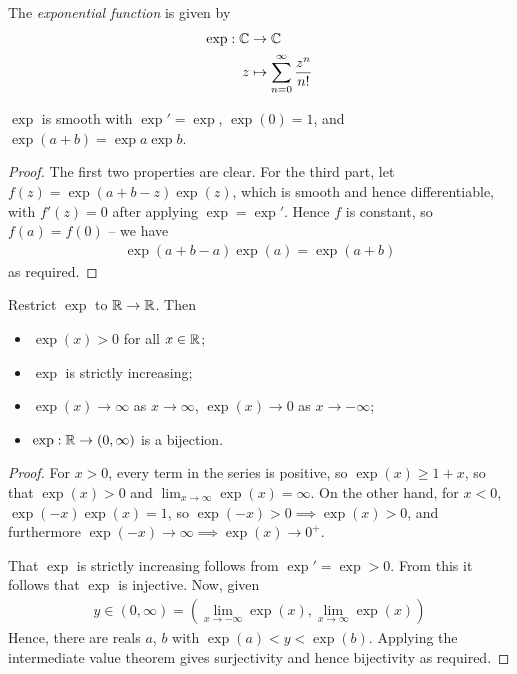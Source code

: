 \documentclass{../../template/note}
\begin{document}
    \begin{definition}
        The \emph{exponential function} is given by
        \begin{align*}
            \exp: \mathbb C &\to \mathbb C \\
            z &\mapsto \sum_{n=0}^\infty \frac{z^n}{n!}
        \end{align*}
    \end{definition}
    
    \begin{lemma}
        \(\exp\) is smooth with \(\exp' = \exp\), \(\exp(0) = 1\), and \(\exp(a+b) = \exp a \exp b\).
    \end{lemma}
    
    \begin{proof}
        The first two properties are clear. For the third part, let \(f(z) = \exp(a+b-z)\exp(z)\), which is smooth and hence differentiable, with \(f'(z) = 0\) after applying \(\exp = \exp'\). Hence \(f\) is constant, so \(f(a) = f(0)\) -- we have
        \begin{align*}
            \exp(a+b-a)\exp(a) = \exp(a+b)
        \end{align*}
        as required.       
    \end{proof}
    
    \begin{lemma}
        Restrict \(\exp\) to \(\mathbb R \to \mathbb R\). Then
        \begin{itemize}
            \item \(\exp(x) > 0\) for all \(x \in \mathbb R\);
            \item \(\exp\) is strictly increasing;
            \item \(\exp(x) \to \infty\) as \(x \to \infty\), \(\exp(x) \to 0\) as \(x \to -\infty\);
            \item \(\exp: \mathbb R \to (0, \infty)\) is a bijection.
        \end{itemize}
    \end{lemma}
    
    \begin{proof}
        For \(x > 0\), every term in the series is positive, so \(\exp(x) \geq 1 + x\), so that \(\exp(x) > 0\) and \(\lim_{x \to \infty}\exp(x) = \infty\). On the other hand, for \(x < 0\), \(\exp(-x)\exp(x) = 1\), so \(\exp(-x) > 0 \implies \exp(x) > 0\), and furthermore \(\exp(-x) \to \infty \implies \exp(x) \to 0^+\).

        That \(\exp\) is strictly increasing follows from \(\exp' = \exp > 0\). From this it follows that \(\exp\) is injective. Now, given
        \begin{align*}
            y \in (0, \infty) = \left(\lim_{x \to -\infty}\exp(x), \lim_{x \to \infty}\exp(x)\right)
        \end{align*}
        Hence, there are reals \(a\), \(b\) with \(\exp(a) < y < \exp(b)\). Applying the intermediate value theorem gives surjectivity and hence bijectivity as required.               
    \end{proof}
    
\end{document}
